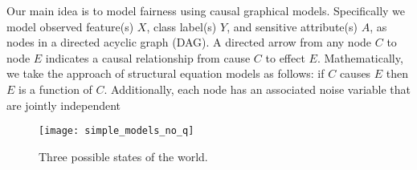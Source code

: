 Our main idea is to model fairness using causal graphical
models\cite{pearl:09}. Specifically we model observed feature(s) $X$,
class label(s) $Y$, and sensitive attribute(s) $A$, as nodes in a
directed acyclic graph (DAG). A directed arrow from any node $C$ to
node $E$ indicates a causal relationship from cause $C$ to effect
$E$. Mathematically, we take the approach of structural equation
models as follows: if $C$ causes $E$ then $E$ is a function of
$C$. Additionally, each node has an associated noise variable that are
jointly independent
















\begin{figure*}[th!]
\begin{center}
\vspace{-2ex}
\centerline{\texttt{[image: simple\_models\_no\_q]}}
\vspace{-2ex}
\caption{Three possible states of the world.\label{figure.simple_models}}
\vspace{-2ex}
\end{center}
\end{figure*}
